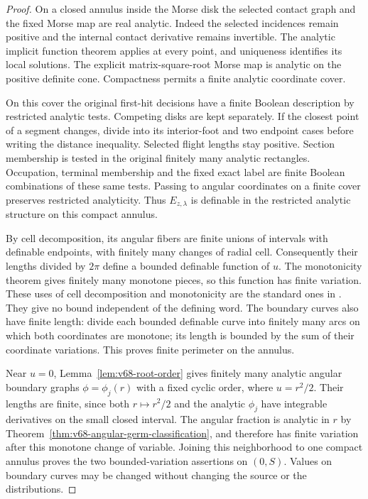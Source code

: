 \begin{proof}
On a closed annulus inside the Morse disk the selected contact graph
and the fixed Morse map are real analytic. Indeed the selected
incidences remain positive and the internal contact derivative remains
invertible. The analytic implicit function theorem applies at every
point, and uniqueness identifies its local solutions. The explicit
matrix-square-root Morse map is analytic on the positive definite
cone. Compactness permits a finite analytic coordinate cover.

On this cover the original first-hit decisions have a finite Boolean
description by restricted analytic tests. Competing disks are kept
separately. If the closest point of a segment changes, divide into its
interior-foot and two endpoint cases before writing the distance
inequality. Selected flight lengths stay positive. Section membership
is tested in the original finitely many analytic rectangles. Occupation,
terminal membership and the fixed exact label are finite Boolean
combinations of these same tests. Passing to angular coordinates on a
finite cover preserves restricted analyticity. Thus $E_{z,\lambda}$
is definable in the restricted analytic structure on this compact
annulus.

By cell decomposition, its angular fibers are finite unions of
intervals with definable endpoints, with finitely many changes of
radial cell. Consequently their lengths divided by $2\pi$ define a
bounded definable function of $u$. The monotonicity theorem gives
finitely many monotone pieces, so this function has finite variation.
These uses of cell decomposition and monotonicity are the standard
ones in \cite{Coste}. They give no bound independent of the defining
word. The boundary curves also have finite length: divide each
bounded definable curve into finitely many arcs on which both
coordinates are monotone; its length is bounded by the sum of their
coordinate variations. This proves finite perimeter on the annulus.

Near $u=0$, Lemma~\ref{lem:v68-root-order} gives finitely many
analytic angular boundary graphs $\phi=\phi_j(r)$ with a fixed
cyclic order, where $u=r^2/2$. Their lengths are finite, since both
$r\mapsto r^2/2$ and the analytic $\phi_j$ have integrable derivatives
on the small closed interval. The angular fraction is analytic in $r$
by Theorem~\ref{thm:v68-angular-germ-classification}, and therefore
has finite variation after this monotone change of variable.
Joining this neighborhood to one compact annulus proves the two
bounded-variation assertions on $(0,S)$. Values on boundary curves
may be changed without changing the source or the distributions.


\end{proof}
